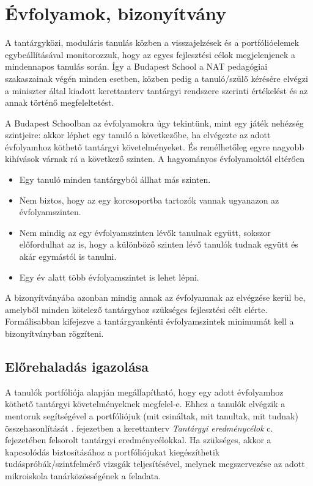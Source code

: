 \section{Évfolyamok, bizonyítvány}
\label{sec:evfolyamok}

A tantárgyközi, moduláris tanulás közben a visszajelzések és a portfólióelemek
egybeállításával monitorozzuk, hogy az egyes fejlesztési célok megjelenjenek a
mindennapos tanulás során. Így a Budapest School a NAT pedagógiai szakaszainak
végén minden esetben, közben pedig a tanuló/szülő kérésére elvégzi a miniszter
által kiadott kerettanterv tantárgyi rendszere szerinti értékelést és az annak
történő megfeleltetést.

A Budapest Schoolban az évfolyamokra úgy tekintünk, mint egy játék nehézség
szintjeire: akkor léphet egy tanuló a következőbe, ha elvégezte az adott
évfolyamhoz köthető tantárgyi követelményeket. És remélhetőleg egyre nagyobb
kihívások várnak rá a következő szinten. A hagyományos évfolyamoktól eltérően

\begin{itemize}
  \item Egy tanuló minden tantárgyból állhat más szinten.
  \item Nem biztos, hogy az egy korcsoportba tartozók vannak ugyanazon az
        évfolyamszinten.
  \item Nem mindig az egy évfolyamszinten lévők tanulnak együtt, sokszor
        előfordulhat az is, hogy a különböző szinten lévő tanulók tudnak együtt és akár
        egymástól is tanulni.
  \item Egy év alatt több évfolyamszintet is lehet lépni.
\end{itemize}

A bizonyítványába azonban mindig annak az évfolyamnak az elvégzése kerül be,
amelyből minden kötelező tantárgyhoz szükséges fejlesztési célt elérte.
Formálisabban kifejezve a tantárgyankénti évfolyamszintek minimumát kell a
bizonyítványban rögzíteni.

\subsection{Előrehaladás igazolása}
A tanulók portfóliója alapján megállapítható, hogy egy adott évfolyamhoz
köthető tantárgyi követelményeknek megfelel-e. Ehhez a tanulók elvégzik a
mentoruk segítségével a portfóliójuk (mit csináltak, mit tanultak, mit tudnak)
összehasonlítását 
\ifkerettanterv 
{}. fejezetben 
\else
a kerettanterv \emph{Tantárgyi eredménycélok} c. fejezetében 
\fi
 felsorolt tantárgyi
eredménycélokkal. Ha szükséges, akkor a kapcsolódás biztosításához a
portfóliójukat kiegészíthetik tudáspróbák/szintfelmérő vizsgák teljesítésével,
melynek megszervezése az adott mikroiskola tanárközösségének a feladata.

